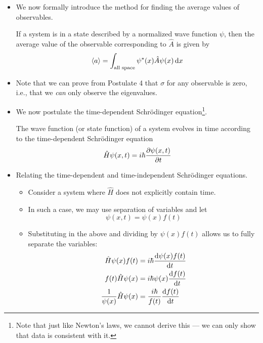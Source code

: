 \documentclass[../notes.tex]{subfiles}
\begin{document}
\begin{itemize}
    \item We now formally introduce the method for finding the average values of observables.
    \begin{postulate}
        If a system is in a state described by a normalized wave function $\psi$, then the average value of the observable corresponding to $\hat{A}$ is given by
        \begin{equation*}
            \langle{a}\rangle = \int_\text{all space}\psi^*(x)\hat{A}\psi(x)\dd{x}
        \end{equation*}
    \end{postulate}
    \item Note that we can prove from Postulate 4 that $\sigma$ for any observable is zero, i.e., that we \emph{can} only observe the eigenvalues.
    \item We now postulate the time-dependent Schr\"{o}dinger equation\footnote{Note that just like Newton's laws, we cannot derive this --- we can only show that data is consistent with it.}.
    \begin{postulate}
        The wave function (or state function) of a system evolves in time according to the time-dependent Schr\"{o}dinger equation
        \begin{equation*}
            \hat{H}\psi(x,t) = i\hbar\pdv{\psi(x,t)}{t}
        \end{equation*}
    \end{postulate}
    \item Relating the time-dependent and time-independent Schr\"{o}dinger equations.
    \begin{itemize}
        \item Consider a system where $\hat{H}$ does not explicitly contain time.
        \item In such a case, we may use separation of variables and let
        \begin{equation*}
            \psi(x,t) = \psi(x)f(t)
        \end{equation*}
        \item Substituting in the above and dividing by $\psi(x)f(t)$ allows us to fully separate the variables:
        \begin{align*}
            \hat{H}\psi(x)f(t) &= i\hbar\dv{\psi(x)f(t)}{t}\\
            f(t)\hat{H}\psi(x) &= i\hbar\psi(x)\dv{f(t)}{t}\\
            \frac{1}{\psi(x)}\hat{H}\psi(x) &= \frac{i\hbar}{f(t)}\dv{f(t)}{t}
        \end{align*}

\end{itemize}
\end{itemize}
\end{document}

